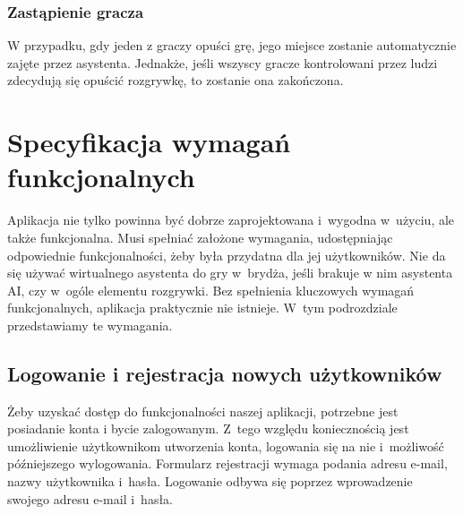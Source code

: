 \FloatBarrier

\subsubsection{Zastąpienie gracza}
W przypadku, gdy jeden z graczy opuści grę, jego miejsce zostanie automatycznie 
zajęte przez asystenta. Jednakże, jeśli wszyscy gracze kontrolowani przez ludzi 
zdecydują się opuścić rozgrywkę, to zostanie ona zakończona.






\section{Specyfikacja wymagań funkcjonalnych}
Aplikacja nie tylko powinna być dobrze zaprojektowana i~wygodna
w~użyciu, ale także funkcjonalna. Musi spełniać założone wymagania,
udostępniając odpowiednie funkcjonalności, żeby była przydatna dla
jej użytkowników. Nie da się używać wirtualnego asystenta do gry
w~brydża, jeśli brakuje w nim asystenta AI, czy w~ogóle elementu
rozgrywki. Bez spełnienia kluczowych wymagań funkcjonalnych,
aplikacja praktycznie nie istnieje. W~tym podrozdziale przedstawiamy
te wymagania.
\subsection{Logowanie i rejestracja nowych użytkowników}
Żeby uzyskać dostęp do funkcjonalności naszej aplikacji, potrzebne
jest posiadanie konta i bycie zalogowanym. Z~tego względu koniecznością
jest umożliwienie użytkownikom utworzenia konta, logowania się na
nie i~możliwość późniejszego wylogowania. Formularz rejestracji wymaga
podania adresu e-mail, nazwy użytkownika i~hasła. Logowanie odbywa się
poprzez wprowadzenie swojego adresu e-mail i~hasła.
